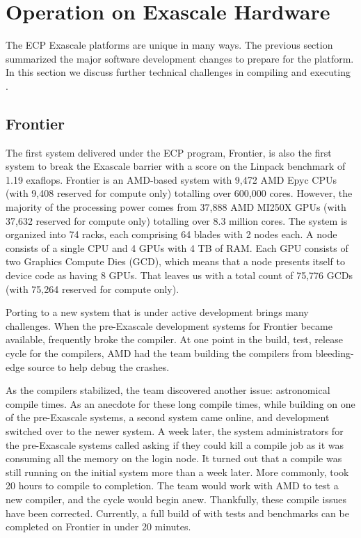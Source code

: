\section{Operation on Exascale Hardware}

The ECP Exascale platforms are unique in many ways.
The previous section summarized the major software development changes to prepare for the platform.
In this section we discuss further technical challenges in compiling and executing \vtkm.


\subsection{Frontier}
The first system delivered under the ECP program, Frontier, is also the first system to break the Exascale barrier with a score on the Linpack benchmark of 1.19 exaflops.
Frontier is an AMD-based system with 9,472 AMD Epyc CPUs (with 9,408 reserved for compute only) totalling over 600,000 cores.
However, the majority of the processing power comes from 37,888 AMD MI250X GPUs (with 37,632 reserved for compute only) totalling over 8.3 million cores.
The system is organized into 74 racks, each comprising 64 blades with 2 nodes each.
A node consists of a single CPU and 4 GPUs with 4 TB of RAM.
Each GPU consists of two Graphics Compute Dies (GCD), which means that a node presents itself to device code as having 8 GPUs.
That leaves us with a total count of 75,776 GCDs (with 75,264 reserved for compute only).

Porting to a new system that is under active development brings many challenges.
When the pre-Exascale development systems for Frontier became available, \vtkm frequently broke the compiler.
At one point in the build, test, release cycle for the compilers, AMD had the \vtkm team building the compilers from bleeding-edge source to help debug the crashes.

As the compilers stabilized, the team discovered another issue: astronomical compile times.
As an anecdote for these long compile times, while building on one of the pre-Exascale systems, a second system came online, and \vtkm development switched over to the newer system.
A week later, the system administrators for the pre-Exascale systems called asking if they could kill a compile job as it was consuming all the memory on the login node.
It turned out that a \vtkm compile was still running on the initial system more than a week later.
More commonly, \vtkm took 20 hours to compile to completion.
The team would work with AMD to test a new compiler, and the cycle would begin anew.
Thankfully, these compile issues have been corrected.
Currently, a full build of \vtkm with tests and benchmarks can be completed on Frontier in under 20 minutes.

